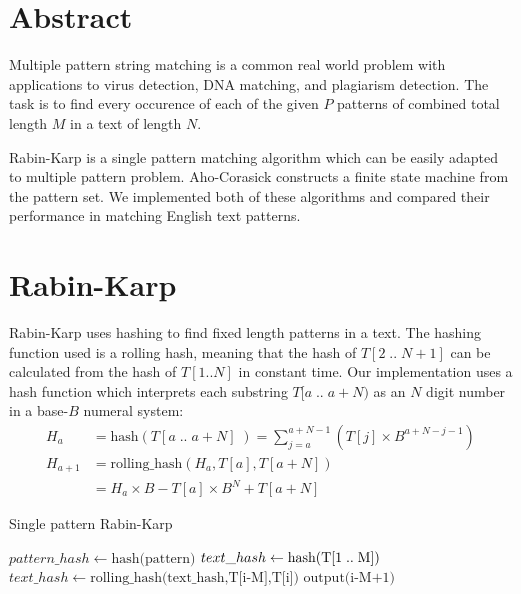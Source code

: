 \documentclass[final]{beamer}
\author{Aleksi Hartikainen and Jussi Kokkala}
\begin{document}
\begin{poster}

\newcolumn

\section{Abstract}
Multiple pattern string matching is a common real world problem with applications to virus detection, DNA matching, and plagiarism detection. The task is to find every occurence of each of the given $P$ patterns of combined total length $M$ in a text of length $N$.

Rabin-Karp is a single pattern matching algorithm which can be easily adapted to multiple pattern problem. Aho-Corasick constructs a finite state machine from the pattern set. We implemented both of these algorithms and compared their performance in matching English text patterns.

\section{Rabin-Karp}
      Rabin-Karp uses hashing to find fixed length patterns in a text. The hashing function used is a rolling hash, meaning that the hash of $T[2\;..\;N+1]$ can be calculated from the hash of $T[1..N]$ in constant time. Our implementation uses a hash function which interprets each substring $T[a\;..\;a+N)$ as an $N$ digit number in a base-$B$ numeral system:
\small
\begin{align*}
H_a &= \text{hash}(T[a\;..\;a+N]\;) = \sum_{j=a}^{a+N-1}(T[j] \times B^{a+N-j-1}) \\
H_{a+1} &= \text{rolling\_hash}(H_a, T[a], T[a+N])\\ 
&= H_a \times B -  T[a] \times B^{N}  + T[a+N]
\end{align*}
\normalsize
\vspace{10mm}
\begin{algorithm} [H]
\small
\caption{Single pattern Rabin-Karp}
\label{alg:rk_single}

\begin{algorithmic}[1]

\State $pattern\_hash \gets \text{hash(pattern)}$
\State $text\_hash \gets \text{hash(T[1\;..\;M])}$
        \State  $text\_hash \gets \text{rolling\_hash(text\_hash,T[i-M],T[i])}$
    \EndIf
            \State $\text{output(i-M+1)}$
        \EndIf
    \EndIf
\EndFor
\end{algorithmic}
\end{algorithm}


\end{poster}
\end{document}
